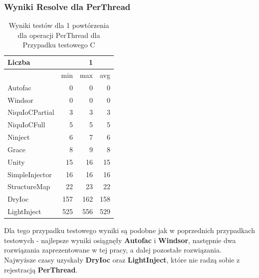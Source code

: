 \documentclass[12pt]{article}
\begin{document}
\subsubsection{Wyniki Resolve dla PerThread}
\begin{table}[H]
\captionsetup{belowskip=0pt,aboveskip=0pt}
\begin{center}
\begin{small}
	\begin{tabular}{ | l | r r r | }
    		\hline
Liczba & & 1 & \\ \hline
 & min & max & avg \\ \hline
Autofac & 0 & 0 & 0 \\ \hline
Windsor & 0 & 0 & 0 \\ \hline
NiquIoCPartial & 3 & 3 & 3 \\ \hline
NiquIoCFull & 5 & 5 & 5 \\ \hline
Ninject & 6 & 7 & 6 \\ \hline
Grace & 8 & 9 & 8 \\ \hline
Unity & 15 & 16 & 15 \\ \hline
SimpleInjector & 16 & 16 & 16 \\ \hline
StructureMap & 22 & 23 & 22 \\ \hline
DryIoc & 157 & 162 & 158 \\ \hline
LightInject & 525 & 556 & 529 \\ \hline
  	\end{tabular}
\end{small}
\end{center}
\caption{Wyniki testów dla 1 powtórzenia dla operacji PerThread dla Przypadku testowego C}
\label{TestCaseC_PerThread1}
\end{table}
Dla tego przypadku testowego wyniki są podobne jak w poprzednich przypadkach testowych - najlepsze wyniki osiągnęły \textbf{Autofac} i \textbf{Windsor}, następnie dwa rozwiązania zaprezentowane w tej pracy, a dalej pozostałe rozwiązania. Najwyższe czasy uzyskały \textbf{DryIoc} oraz \textbf{LightInject}, które nie radzą sobie z rejestracją \textbf{PerThread}.
\\ \\
\end{document}
